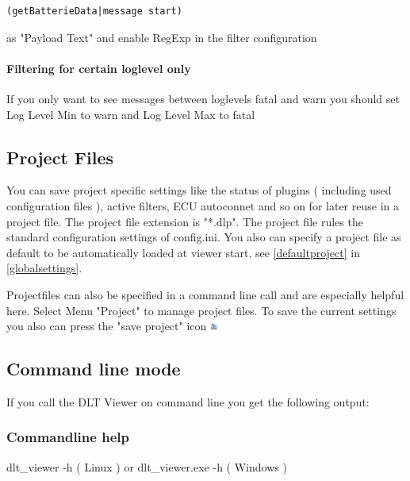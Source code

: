 \documentclass[a4paper,11pt]{article}
\begin{document}
\begin{verbatim}
(getBatterieData|message start)
\end{verbatim}

as "Payload Text" and enable RegExp in the filter configuration

\paragraph{Filtering for certain loglevel only}
If you only want to see messages between loglevels fatal and warn you should set Log Level Min to warn and Log Level Max to fatal


\pagebreak
\subsection{Project Files}
\label{projectfiles}
You can save project specific settings like the status of plugins ( including used configuration files ), active filters, ECU autoconnet and so on for later reuse
in a project file. The project file extension is "*.dlp".
The project file rules the standard configuration settings of config.ini.
You also can specify a project file as default to be automatically loaded at viewer start, see \autoref{defaultproject} in \autoref{globalsettings}.

Projectfiles can also be specified in a command line call and are especially helpful here.
Select Menu "Project" to manage project files. To save the current settings you also can press the "save project" icon \includegraphics[width=0.02\textwidth]{images/saveprojecticon.png}

\pagebreak
\subsection{Command line mode}
\label{commandlinemode}
If you call the DLT Viewer on command line you get the following output:

\subsubsection{Commandline help}

dlt\_viewer -h ( Linux ) or dlt\_viewer.exe -h ( Windows )
\end{document}
